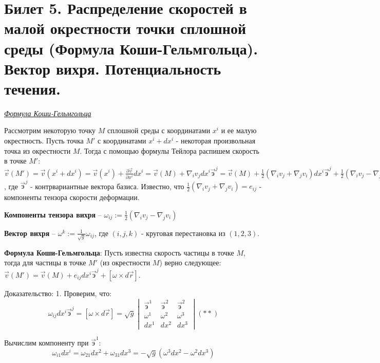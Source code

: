 \newpage
\section{Билет 5. Распределение скоростей в малой окрестности точки сплошной среды (Формула Коши-Гельмгольца). Вектор вихря. Потенциальность течения.}

\begin{center}
	\textit{\underline{Формула Коши-Гельмгольца}}
\end{center}

Рассмотрим некоторую точку $M$ сплошной среды с координатами $x^i$ и ее малую окрестность. Пусть точка $M'$ с координатами $x^i + dx^i$ - некоторая произвольная точка из окрестности $M$. Тогда с помощью формулы Тейлора распишем скорость в точке $M'$:
$
\vec{v} (M') = \vec{v} (x^i + dx^i) = \vec{v}(x^i) + \frac{\partial \vec{v}}{\partial x^i}dx^i = \vec{v} (M) + \nabla_i v_j dx^i \vec{\text{э}}^j = \vec{v} (M) + \frac{1}{2}(\nabla_i v_j  + \nabla_j v_i)dx^i \vec{\text{э}}^j + \frac{1}{2}(\nabla_i v_j  - \nabla_j v_i)dx^i \vec{\text{э}}^j (*)
$, где $\vec{\text{э}}^j$ - контрвариантные вектора базиса. Известно, что $\frac{1}{2}(\nabla_i v_j + \nabla_j v_i) = e_{ij}$ - компоненты тензора скорости деформации.

 \textbf{Компоненты тензора вихря} -- $ \omega_{ij} := \frac{1}{2}(\nabla_i v_j - \nabla_j v_i)$

 \textbf{Вектор вихря} -- $\omega^k := \frac{1}{\sqrt{g}}\omega_{ij}$, где  $(i, j, k)$ - круговая перестановка из $(1, 2, 3)$.

\state \textbf{Формула Коши-Гельмгольца}: Пусть известна скорость частицы в точке $M$, тогда для частицы в точке $M'$ (из окрестности $M$) верно следующее: $\vec{v}(M') = \vec{v}(M) + e_{ij}dx^i \vec{{\text{э}}}^j + [\omega \times d\vec{r}]$. 

Доказательство:
1. Проверим, что:
\begin{equation*}
	\omega_{ij}dx^i \vec{\text{э}}^j = [\omega \times d\vec{r}] = \sqrt{g}
	\begin{vmatrix}
		\vec{\text{э}}^1 & \vec{\text{э}}^2 & \vec{\text{э}}^2\\
		\omega^1 & \omega^2 & \omega^3\\
		dx^1 & dx^2 & dx^3
	\end{vmatrix}
	(**)
\end{equation*}

Вычислим компоненту при $\vec{\text{э}}^1$:
$$\omega_{i1}dx^i = \omega_{21}dx^2 + \omega_{31}dx^3 = -\sqrt{g}(\omega^3 dx^2 - \omega^2dx^3)$$

